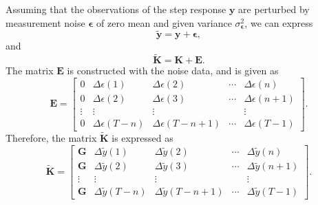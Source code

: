 
Assuming that the observations of the step response $\mathbf{y}$ are perturbed by measurement noise $\bm{\epsilon}$ of zero mean and given variance $\sigma_{\bm{\epsilon}}^2$, we can express 
\begin{equation} \widetilde{\mathbf{y}} = \mathbf{y} + \bm{\epsilon} , \label{eqn:y0plusnoise} \end{equation} 
and
\begin{equation} \widetilde{\mathbf{K}} = \mathbf{K} + \mathbf{E} . \label{eqn:K0plusnoise} \end{equation}The matrix $\mathbf{E}$ is constructed with the noise data, and is given as
\begin{equation} \mathbf{E} = \begin{bmatrix} 0 & \Delta \epsilon(1) & \Delta \epsilon(2) & \cdots & \Delta \epsilon(n) \\ 0 & \Delta \epsilon(2) & \Delta \epsilon(3) & \cdots & \Delta \epsilon(n+1) \\ \vdots & \vdots & \vdots & & \vdots \\ 0 & \Delta \epsilon(T-n) & \Delta \epsilon(T-n+1) & \cdots & \Delta \epsilon(T-1) \end{bmatrix} . \label{eqn:matrixE} \end{equation}
Therefore, the matrix $\widetilde{\mathbf{K}}$ is expressed as
\begin{equation} \widetilde{\mathbf{K}} = \begin{bmatrix} \mathbf{G} & \Delta \widetilde{y}(1) & \Delta \widetilde{y}(2) & \cdots & \Delta \widetilde{y}(n) \\ \mathbf{G} & \Delta \widetilde{y}(2) & \Delta \widetilde{y}(3) & \cdots & \Delta \widetilde{y}(n+1) \\ \vdots & \vdots & \vdots & & \vdots \\ \mathbf{G} & \Delta \widetilde{y}(T-n) & \Delta \widetilde{y}(T-n+1) & \cdots & \Delta \widetilde{y}(T-1) \end{bmatrix} . \label{eqn:matrixK} \end{equation}

